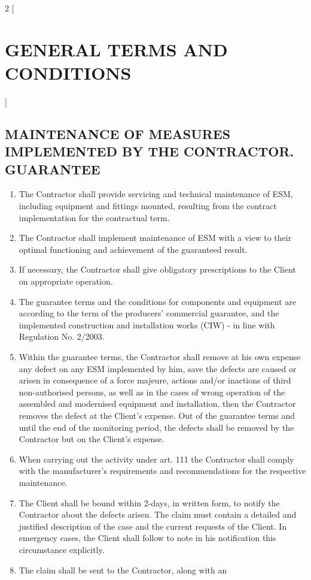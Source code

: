 \begin{multicols}{2} [\section{GENERAL TERMS AND CONDITIONS}]
      \subsection{MAINTENANCE OF MEASURES IMPLEMENTED BY THE
        CONTRACTOR. GUARANTEE}
      \begin{enumerate}
      \item The Contractor shall provide servicing and technical
        maintenance of ESM, including equipment and fittings mounted,
        resulting from the contract implementation for the contractual
        term.
      \item The Contractor shall implement maintenance of ESM with a
        view to their optimal functioning and achievement of the
        guaranteed result.
      \item If necessary, the Contractor shall give obligatory
        prescriptions to the Client on appropriate operation.
      \item The guarantee terms and the conditions for components and
        equipment are according to the term of the producers’
        commercial guarantee, and the implemented construction and
        installation works (CIW) {-} in line with Regulation No. 2/2003.
      \item Within the guarantee terms, the Contractor shall remove at
        his own expense any defect on any ESM implemented by him, save
        the defects are caused or arisen in consequence of a force
        majeure, actions and/or inactions of third non-authorised
        persons, as well as in the cases of wrong operation of the
        assembled and modernised equipment and installation, then the
        Contractor removes the defect at the Client’s expense. Out of
        the guarantee terms and until the end of the monitoring
        period, the defects shall be removed by the Contractor but on
        the Client’s expense.
      \item When carrying out the activity under art. 111 the
        Contractor shall comply with the manufacturer’s requirements
        and recommendations for the respective maintenance.
      \item The Client shall be bound within 2-days, in written form,
        to notify the Contractor about the defects arisen. The claim
        must contain a detailed and justified description of the case
        and the current requests of the Client. In emergency cases,
        the Client shall follow to note in his notification this
        circumstance explicitly.
      \item The claim shall be sent to the Contractor, along with an

\end{enumerate}
\end{multicols}
